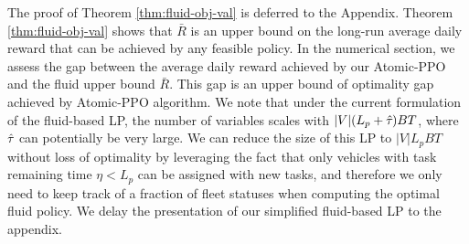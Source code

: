 The proof of Theorem \ref{thm:fluid-obj-val} is deferred to the Appendix. Theorem \ref{thm:fluid-obj-val} shows that $\bar{R}$ is an upper bound on the long-run average daily reward that can be achieved by any feasible policy. In the numerical section, we assess the gap between the average daily reward achieved by our Atomic-PPO and the fluid upper bound $\bar{R}$. This gap is an upper bound of optimality gap achieved by Atomic-PPO algorithm. We note that under the current formulation of the fluid-based LP, the number of variables scales with $\vert V \vert (L_p + \hat{\tau}_{}{}) B T$, where $\hat{\tau}_{}{}$ can potentially be very large. We can reduce the size of this LP to $|V|L_pBT$ without loss of optimality by leveraging the fact that only vehicles with task remaining time $\eta < L_p$ can be assigned with new tasks, and therefore we only need to keep track of a fraction of fleet statuses when computing the optimal fluid policy. We delay the presentation of our simplified fluid-based LP to the appendix.
